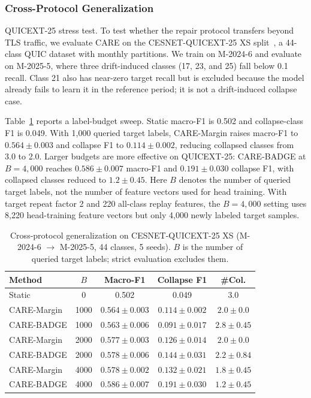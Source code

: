 \documentclass[preprint,12pt,authoryear]{elsarticle}
\let\cite\citep
\newcommand{\ours}{CARE}  %
\begin{document}
\subsubsection{Cross-Protocol Generalization}
\label{sec:cross_protocol}

QUICEXT-25 stress test.
\label{sec:quicext25}
To test whether the repair protocol transfers beyond TLS traffic, we evaluate \ours{} on the CESNET-QUICEXT-25 XS split~\cite{cesnetquicext25,mucke2025waiting}, a 44-class QUIC dataset with monthly partitions.
We train on M-2024-6 and evaluate on M-2025-5, where three drift-induced classes (17, 23, and 25) fall below 0.1 recall.
Class 21 also has near-zero target recall but is excluded because the model already fails to learn it in the reference period; it is not a drift-induced collapse case.

Table~\ref{tab:quicext25} reports a label-budget sweep.
Static macro-F1 is 0.502 and collapse-class F1 is 0.049.
With 1{,}000 queried target labels, \ours{}-Margin raises macro-F1 to $0.564{\pm}0.003$ and collapse F1 to $0.114{\pm}0.002$, reducing collapsed classes from 3.0 to 2.0.
Larger budgets are more effective on QUICEXT-25: \ours{}-BADGE at $B{=}4{,}000$ reaches $0.586{\pm}0.007$ macro-F1 and $0.191{\pm}0.030$ collapse F1, with collapsed classes reduced to $1.2{\pm}0.45$.
Here $B$ denotes the number of queried target labels, not the number of feature vectors used for head training.
With target repeat factor 2 and 220 all-class replay features, the $B{=}4{,}000$ setting uses 8{,}220 head-training feature vectors but only 4{,}000 newly labeled target samples.

\begin{table}[!htbp]
\centering
\caption{Cross-protocol generalization on CESNET-QUICEXT-25 XS (M-2024-6 $\to$ M-2025-5, 44 classes, 5 seeds). $B$ is the number of queried target labels; strict evaluation excludes them.}
\label{tab:quicext25}
\scriptsize
\setlength{\tabcolsep}{3pt}
\begin{tabular}{@{}l c c c c@{}}
\toprule
Method & $B$ & Macro-F1 & Collapse F1 & \#Col. \\
\midrule
Static & 0 & 0.502 & 0.049 & 3.0 \\
\ours{}-Margin & 1000 & $0.564{\pm}0.003$ & $0.114{\pm}0.002$ & $2.0{\pm}0.0$ \\
\ours{}-BADGE & 1000 & $0.563{\pm}0.006$ & $0.091{\pm}0.017$ & $2.8{\pm}0.45$ \\
\ours{}-Margin & 2000 & $0.577{\pm}0.003$ & $0.126{\pm}0.014$ & $2.0{\pm}0.0$ \\
\ours{}-BADGE & 2000 & $0.578{\pm}0.006$ & $0.144{\pm}0.031$ & $2.2{\pm}0.84$ \\
\ours{}-Margin & 4000 & $0.578{\pm}0.002$ & $0.132{\pm}0.021$ & $1.8{\pm}0.45$ \\
\ours{}-BADGE & 4000 & $\mathbf{0.586{\pm}0.007}$ & $\mathbf{0.191{\pm}0.030}$ & $\mathbf{1.2{\pm}0.45}$ \\
\bottomrule
\end{tabular}
\end{table}
\end{document}
